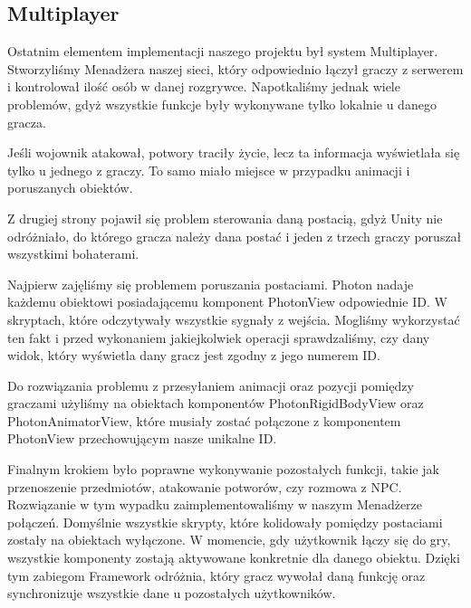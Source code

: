 \subsection{Multiplayer}
Ostatnim elementem implementacji naszego projektu był system Multiplayer. Stworzyliśmy Menadżera naszej sieci, który odpowiednio łączył graczy z serwerem i kontrolował ilość osób w danej rozgrywce. Napotkaliśmy jednak wiele problemów, gdyż wszystkie funkcje były wykonywane tylko lokalnie u danego gracza.

Jeśli wojownik atakował, potwory traciły życie, lecz ta informacja wyświetlała się tylko u jednego z graczy. To samo miało miejsce w przypadku animacji i poruszanych obiektów.

Z drugiej strony pojawił się problem sterowania daną postacią, gdyż Unity nie odróżniało, do którego gracza należy dana postać i jeden z trzech graczy poruszał wszystkimi bohaterami.

Najpierw zajęliśmy się problemem poruszania postaciami. Photon nadaje każdemu obiektowi posiadającemu komponent PhotonView odpowiednie ID. W skryptach, które odczytywały wszystkie sygnały z wejścia. Mogliśmy wykorzystać ten fakt i przed wykonaniem jakiejkolwiek operacji sprawdzaliśmy, czy dany widok, który wyświetla dany gracz jest zgodny z jego numerem ID. 

Do rozwiązania problemu z przesyłaniem animacji oraz pozycji pomiędzy graczami użyliśmy na obiektach komponentów PhotonRigidBodyView oraz PhotonAnimatorView, które musiały zostać połączone z komponentem PhotonView przechowującym nasze unikalne ID.

Finalnym krokiem było poprawne wykonywanie pozostałych funkcji, takie jak przenoszenie przedmiotów, atakowanie potworów, czy rozmowa z NPC.
Rozwiązanie w tym wypadku zaimplementowaliśmy w naszym Menadżerze połączeń. 
Domyślnie wszystkie skrypty, które kolidowały pomiędzy postaciami zostały na obiektach wyłączone. W momencie, gdy użytkownik łączy się do gry, wszystkie komponenty zostają aktywowane konkretnie dla danego obiektu. Dzięki tym zabiegom Framework odróżnia, który gracz wywołał daną funkcję oraz synchronizuje wszystkie dane u pozostałych użytkowników.
